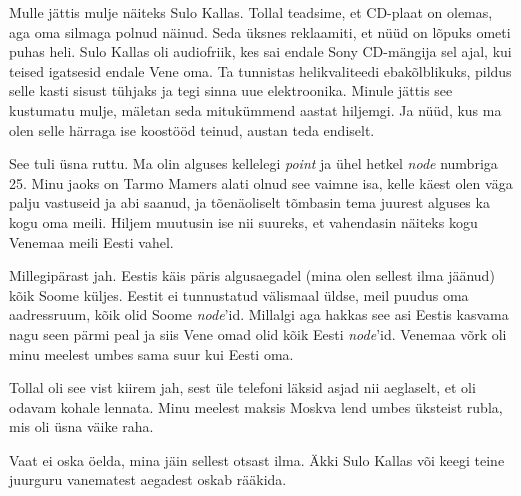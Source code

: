 
Mulle jättis mulje näiteks Sulo Kallas. Tollal teadsime, et CD-plaat
on olemas, aga oma silmaga polnud näinud. Seda üksnes reklaamiti, et nüüd on lõpuks 
ometi puhas heli. Sulo Kallas oli audiofriik, kes sai endale Sony CD-mängija sel ajal, kui teised igatsesid endale Vene oma. Ta tunnistas helikvaliteedi ebakõlblikuks, pildus selle kasti sisust tühjaks ja tegi sinna uue 
elektroonika. Minule jättis see kustumatu mulje, mäletan seda mitukümmend 
aastat hiljemgi. Ja nüüd, kus ma olen selle härraga ise koostööd teinud, austan teda endiselt.


See tuli üsna ruttu. Ma olin alguses kellelegi \emph{point} ja ühel 
hetkel \emph{node} numbriga 25. Minu jaoks on Tarmo Mamers alati olnud see vaimne isa, kelle käest olen väga palju vastuseid ja abi
saanud, ja tõenäoliselt tõmbasin tema juurest alguses ka kogu 
oma meili. Hiljem muutusin ise nii suureks, et vahendasin näiteks kogu 
Venemaa meili Eesti vahel. 


Millegipärast jah. Eestis käis päris 
algusaegadel (mina olen sellest ilma jäänud) kõik Soome küljes. 
Eestit ei tunnustatud välismaal üldse, meil puudus oma aadressruum, kõik olid 
Soome \emph{node}'id. Millalgi aga hakkas see asi Eestis kasvama nagu seen pärmi 
peal ja siis Vene omad olid kõik Eesti \emph{node}'id. Venemaa võrk oli minu 
meelest umbes sama suur kui Eesti oma. 


Tollal oli see vist kiirem jah, sest üle telefoni läksid asjad nii 
aeglaselt, et oli odavam kohale lennata. Minu meelest maksis
Moskva lend umbes üksteist rubla, mis oli üsna väike 
raha.


Vaat ei oska öelda, mina jäin sellest otsast ilma. Äkki Sulo 
Kallas või keegi teine juurguru vanematest aegadest 
oskab rääkida. 


